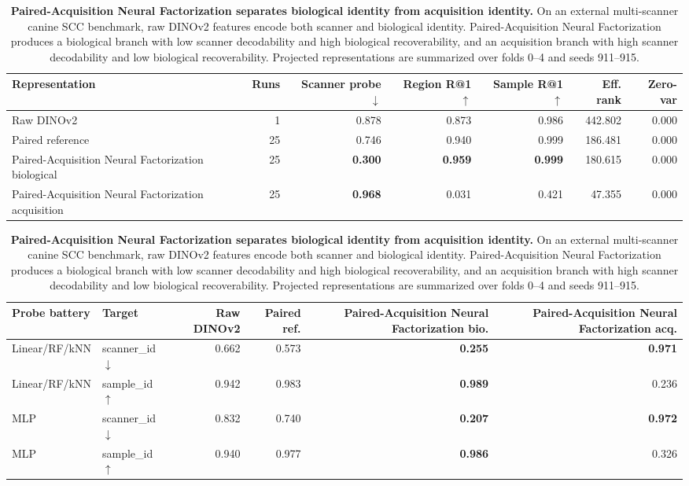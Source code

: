 
\begin{table}[t]
\centering
\small
\caption{\textbf{Paired-Acquisition Neural Factorization separates biological identity from acquisition identity.}
On an external multi-scanner canine SCC benchmark, raw DINOv2 features encode both scanner and biological identity.
Paired-Acquisition Neural Factorization produces a biological branch with low scanner decodability and high biological recoverability, and an acquisition branch with high scanner decodability and low biological recoverability.
Projected representations are summarized over folds 0--4 and seeds 911--915.}
\label{tab:paired_acquisition_figure1_benchmark}
\begin{tabular}{lrrrrrr}
\toprule
Representation & Runs & Scanner probe $\downarrow$ & Region R@1 $\uparrow$ & Sample R@1 $\uparrow$ & Eff. rank & Zero-var \\
\midrule
Raw DINOv2 & 1 & 0.878 & 0.873 & 0.986 & 442.802 & 0.000 \\
Paired reference & 25 & 0.746 & 0.940 & 0.999 & 186.481 & 0.000 \\
Paired-Acquisition Neural Factorization biological & 25 & \textbf{0.300} & \textbf{0.959} & \textbf{0.999} & 180.615 & 0.000 \\
Paired-Acquisition Neural Factorization acquisition & 25 & \textbf{0.968} & 0.031 & 0.421 & 47.355 & 0.000 \\
\bottomrule
\end{tabular}
\vspace{0.5em}

\begin{tabular}{llrrrr}
\toprule
Probe battery & Target & Raw DINOv2 & Paired ref. & Paired-Acquisition Neural Factorization bio. & Paired-Acquisition Neural Factorization acq. \\
\midrule
Linear/RF/kNN & scanner\_id $\downarrow$ & 0.662 & 0.573 & \textbf{0.255} & \textbf{0.971} \\
Linear/RF/kNN & sample\_id $\uparrow$ & 0.942 & 0.983 & \textbf{0.989} & 0.236 \\
MLP & scanner\_id $\downarrow$ & 0.832 & 0.740 & \textbf{0.207} & \textbf{0.972} \\
MLP & sample\_id $\uparrow$ & 0.940 & 0.977 & \textbf{0.986} & 0.326 \\
\bottomrule
\end{tabular}
\end{table}
